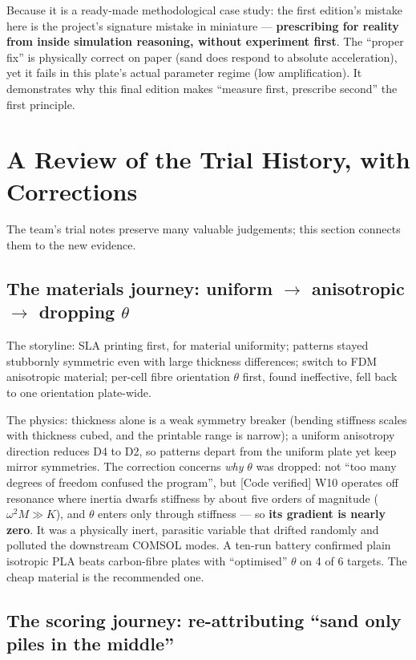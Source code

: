 \documentclass[11pt,a4paper]{article}
\begin{document}
Because it is a ready-made methodological case study: the first edition's mistake here is the project's signature mistake in miniature --- \textbf{prescribing for reality from inside simulation reasoning, without experiment first}. The ``proper fix'' is physically correct on paper (sand does respond to absolute acceleration), yet it fails in this plate's actual parameter regime (low amplification). It demonstrates why this final edition makes ``measure first, prescribe second'' the first principle.

\section{A Review of the Trial History, with Corrections}

The team's trial notes preserve many valuable judgements; this section connects them to the new evidence.

\subsection{The materials journey: uniform $\rightarrow$ anisotropic $\rightarrow$ dropping $\theta$}

The storyline: SLA printing first, for material uniformity; patterns stayed stubbornly symmetric even with large thickness differences; switch to FDM anisotropic material; per-cell fibre orientation $\theta$ first, found ineffective, fell back to one orientation plate-wide.

The physics: thickness alone is a weak symmetry breaker (bending stiffness scales with thickness cubed, and the printable range is narrow); a uniform anisotropy direction reduces D4 to D2, so patterns depart from the uniform plate yet keep mirror symmetries. The correction concerns \emph{why} $\theta$ was dropped: not ``too many degrees of freedom confused the program'', but [Code verified] W10 operates off resonance where inertia dwarfs stiffness by about five orders of magnitude ($\omega^2 M \gg K$), and $\theta$ enters only through stiffness --- so \textbf{its gradient is nearly zero}. It was a physically inert, parasitic variable that drifted randomly and polluted the downstream COMSOL modes. A ten-run battery confirmed plain isotropic PLA beats carbon-fibre plates with ``optimised'' $\theta$ on 4 of 6 targets. The cheap material is the recommended one.

\subsection{The scoring journey: re-attributing ``sand only piles in the middle''}
\end{document}
